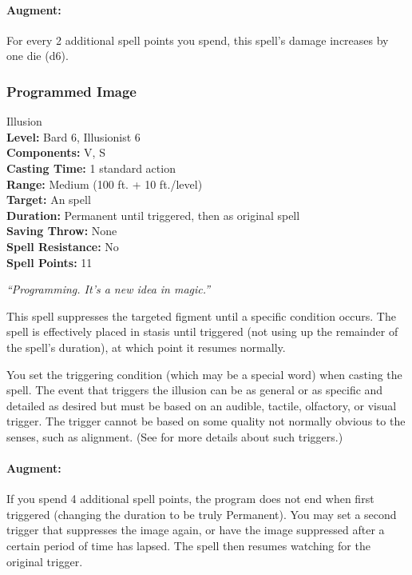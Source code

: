 \paragraph{Augment:} For every 2 additional spell points you spend, this spell's damage increases by one die (d6).

\subsubsection{Programmed Image}
\label{Spell:ProgrammedImage}
Illusion
\\ \textbf{Level:} Bard 6, Illusionist 6
\\ \textbf{Components:} V, S
\\ \textbf{Casting Time:} 1 standard action
\\ \textbf{Range:} Medium (100 ft. + 10 ft./level)
\\ \textbf{Target:} An  spell
\\ \textbf{Duration:} Permanent until triggered, then as original spell
\\ \textbf{Saving Throw:} None
\\ \textbf{Spell Resistance:} No
\\ \textbf{Spell Points:} 11

\emph{``Programming. It's a new idea in magic.''}

This spell suppresses the targeted figment until a specific condition occurs. 
The spell is effectively placed in stasis until triggered (not using up the remainder of the spell's duration),
at which point it resumes normally.

You set the triggering condition (which may be a special word) when casting the spell. 
The event that triggers the illusion can be as general or as specific and detailed as desired but must be based on an audible, tactile, olfactory, or visual trigger. 
The trigger cannot be based on some quality not normally obvious to the senses, such as alignment. (See  for more details about such triggers.)

\paragraph{Augment:} If you spend 4 additional spell points, the program does not end when first triggered (changing the duration to be truly Permanent).
You may set a second trigger that suppresses the image again, or have the image suppressed after a certain period of time has lapsed.
The spell then resumes watching for the original trigger.
